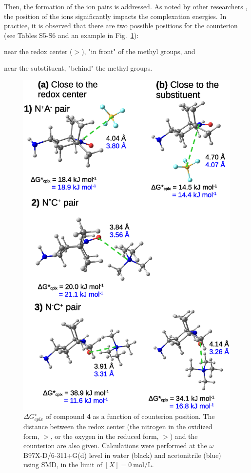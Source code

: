 \documentclass[review,preprint]{elsarticle}
\begin{document}
\clearpage

Then, the formation of the ion pairs is addressed. As noted by other researchers \cite{zhangInteractionsImidazoliumBasedIonic2016,wylieImprovedPerformanceAllOrganic2019a}, the position of the ions significantly impacts the complexation energies. In practice, it is observed that there are two possible positions for the counterion (see Tables S5-S6 and an example in Fig.~\ref{fig:pos-anion}):
\begin{inparaenum}[(i)]
	\item near the redox center ($>$), "in front" of the methyl groups, and
	\item near the substituent, "behind" the methyl groups.
\end{inparaenum}

\begin{figure}[!h]
	\centering
	\includegraphics[width=.8\linewidth]{Figure12}
	\caption{$\Delta G^\star_{cplx}$ of compound \textbf{4} as a function of counterion position. The distance between the redox center (the nitrogen in the oxidized form, $>$, or the oxygen in the reduced form, $>$) and the counterion are also given. Calculations were performed at the $\omega$B97X-D/6-311+G(d) level in water (black) and acetonitrile (blue) using SMD, in the limit of $[X]=\SI{0}{\mole\per\liter}$.}
	\label{fig:pos-anion}
\end{figure}
\end{document}
